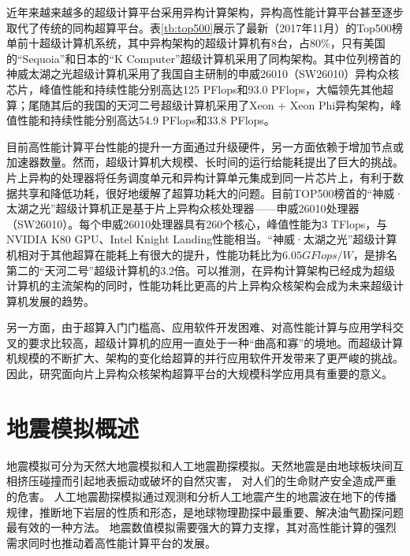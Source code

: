 近年来越来越多的超级计算平台采用异构计算架构\cite{buyya1999high}，异构高性能计算平台甚至逐步取代了传统的同构超算平台。表\ref{tb:top500}展示了最新（2017年11月）的Top500榜单前十超级计算机系统，其中异构架构的超级计算机有8台，占80\%，只有美国的“Sequoia”和日本的“K Computer”超级计算机采用了同构架构。其中位列榜首的神威太湖之光超级计算机采用了我国自主研制的申威26010（SW26010）异构众核芯片，峰值性能和持续性能分别高达125 PFlops和93.0 PFlops，大幅领先其他超算；尾随其后的我国的天河二号超级计算机采用了Xeon + Xeon Phi异构架构，峰值性能和持续性能分别高达54.9 PFlops和33.8 PFlops。

目前高性能计算平台性能的提升一方面通过升级硬件，另一方面依赖于增加节点或加速器数量。然而，超级计算机大规模、长时间的运行给能耗提出了巨大的挑战\cite{reed2015exascale}。片上异构的处理器将任务调度单元和异构计算单元集成到同一片芯片上，有利于数据共享和降低功耗，很好地缓解了超算功耗大的问题。目前TOP500榜首的“神威·太湖之光”超级计算机正是基于片上异构众核处理器\cite{fu2016sunway}——申威26010处理器（SW26010）。每个申威26010处理器具有260个核心，峰值性能为3 TFlops，与NVIDIA K80 GPU、Intel Knight Landing性能相当\cite{einkemmer2017evaluation,sodani2016knights}。“神威·太湖之光”超级计算机相对于其他超算在能耗上有很大的提升，性能功耗比为$6.05GFlops/W$，是排名第二的“天河二号”超级计算机的3.2倍。可以推测，在异构计算架构已经成为超级计算机的主流架构的同时，性能功耗比更高的片上异构众核架构会成为未来超级计算机发展的趋势。

另一方面，由于超算入门门槛高、应用软件开发困难、对高性能计算与应用学科交叉的要求比较高，超级计算机的应用一直处于一种“曲高和寡”的境地。而超级计算机规模的不断扩大、架构的变化给超算的并行应用软件开发带来了更严峻的挑战。因此，研究面向片上异构众核架构超算平台的大规模科学应用具有重要的意义。


\section{地震模拟概述}

地震模拟可分为天然大地震模拟和人工地震勘探模拟。天然地震是由地球板块间互相挤压碰撞而引起地表振动或破坏的自然灾害，
对人们的生命财产安全造成严重的危害\cite{earthquakebaidu}。
人工地震勘探模拟通过观测和分析人工地震产生的地震波在地下的传播规律，推断地下岩层的性质和形态，是地球物理勘探中最重要、解决油气勘探问题最有效的一种方法\cite{地震勘探}。
地震数值模拟需要强大的算力支撑，其对高性能计算的强烈需求同时也推动着高性能计算平台的发展。

